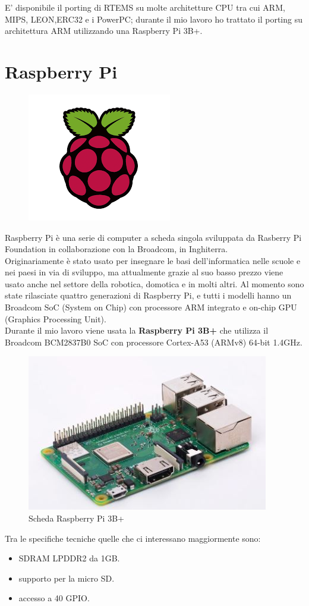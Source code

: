 \documentclass[12pt, a4paper, titlepage, oneside]{book}
\begin{document}
\begin{flushleft}
E' disponibile il porting di RTEMS su molte architetture CPU tra cui ARM, MIPS, LEON,ERC32 e i PowerPC; durante il mio lavoro ho trattato il porting su architettura ARM utilizzando una Raspberry Pi 3B+.
\section{Raspberry Pi}
\begin{figure}[h]
    \centering
    \includegraphics[scale = 0.70]{raspberrypiLogo.png}
\end{figure}
Raspberry Pi è una serie di computer a scheda singola sviluppata da Rasberry Pi Foundation in collaborazione con la Broadcom, in Inghiterra.\\
Originariamente è stato usato per insegnare le basi dell'informatica nelle scuole e nei paesi in via di sviluppo, ma attualmente grazie al suo basso prezzo viene usato anche nel settore della robotica, domotica e in molti altri.
Al momento sono state rilasciate quattro generazioni di Raspberry Pi, e tutti i modelli hanno un Broadcom SoC (System on Chip) con processore ARM integrato e on-chip GPU (Graphics Processing Unit).\\
Durante il mio lavoro viene usata la \textbf{Raspberry Pi 3B+} che utilizza il Broadcom BCM2837B0 SoC \cite{bcm2837} con processore Cortex-A53 (ARMv8) 64-bit 1.4GHz.
\newpage
\begin{figure} [h]
    \centering
    \includegraphics[scale = 1.25]{RPi3B.JPG}
    \caption{Scheda Raspberry Pi 3B+}
    \label{fig:RPI3B_laver}
\end{figure}
Tra le specifiche tecniche quelle che ci interessano maggiormente sono:
\begin{itemize}
    \item SDRAM LPDDR2 da 1GB.
    \item supporto per la micro SD.
    \item accesso a 40 GPIO.
\end{itemize}


\end{flushleft}
\end{document}
